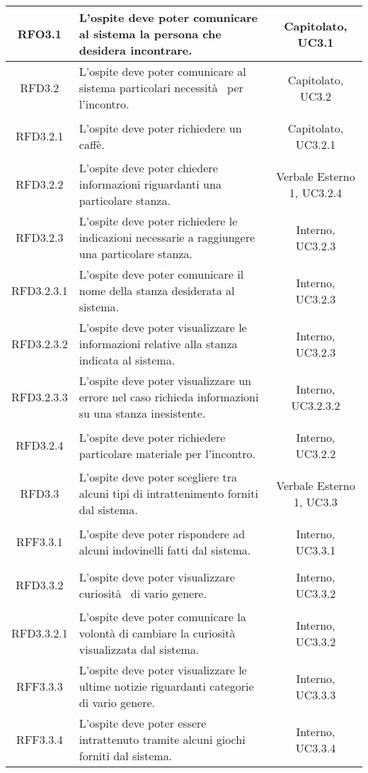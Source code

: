 \begin{longtable}{|c|>{\centering}m{7cm}|c|}
\hypertarget{RFO3.1}{RFO3.1} & L'ospite deve poter comunicare al sistema la persona che desidera incontrare. & Capitolato, UC3.1\\ \hline
\hypertarget{RFD3.2}{RFD3.2} & L'ospite deve poter comunicare al sistema particolari necessità  per l'incontro. & Capitolato, UC3.2\\ \hline
\hypertarget{RFD3.2.1}{RFD3.2.1} & L'ospite deve poter richiedere un caffè. & Capitolato, UC3.2.1\\ \hline
\hypertarget{RFD3.2.2}{RFD3.2.2} & L'ospite deve poter chiedere informazioni riguardanti una particolare stanza. & Verbale Esterno 1, UC3.2.4\\ \hline
\hypertarget{RFD3.2.3}{RFD3.2.3} & L'ospite deve poter richiedere le indicazioni necessarie a raggiungere una particolare stanza. & Interno, UC3.2.3\\ \hline
\hypertarget{RFD3.2.3.1}{RFD3.2.3.1} & L'ospite deve poter comunicare il nome della stanza desiderata al sistema. & Interno, UC3.2.3\\ \hline
\hypertarget{RFD3.2.3.2}{RFD3.2.3.2} & L'ospite deve poter visualizzare le informazioni relative alla stanza indicata al sistema. & Interno, UC3.2.3\\ \hline
\hypertarget{RFD3.2.3.3}{RFD3.2.3.3} & L'ospite deve poter visualizzare un errore nel caso richieda informazioni su una stanza inesistente. & Interno, UC3.2.3.2\\ \hline
\hypertarget{RFD3.2.4}{RFD3.2.4} & L'ospite deve poter richiedere particolare materiale per l'incontro. & Interno, UC3.2.2\\ \hline
\hypertarget{RFD3.3}{RFD3.3} & L'ospite deve poter scegliere tra alcuni tipi di intrattenimento forniti dal sistema. & Verbale Esterno 1, UC3.3\\ \hline
\hypertarget{RFF3.3.1}{RFF3.3.1} & L'ospite deve poter rispondere ad alcuni indovinelli fatti dal sistema. & Interno, UC3.3.1\\ \hline
\hypertarget{RFD3.3.2}{RFD3.3.2} & L'ospite deve poter visualizzare curiosità  di vario genere. & Interno, UC3.3.2\\ \hline
\hypertarget{RFD3.3.2.1}{RFD3.3.2.1} & L'ospite deve poter comunicare la volontà di cambiare la curiosità visualizzata dal sistema. & Interno, UC3.3.2\\ \hline
\hypertarget{RFF3.3.3}{RFF3.3.3} & L'ospite deve poter visualizzare le ultime notizie riguardanti categorie di vario genere. & Interno, UC3.3.3\\ \hline
\hypertarget{RFF3.3.4}{RFF3.3.4} & L'ospite deve poter essere intrattenuto tramite alcuni giochi forniti dal sistema. & Interno, UC3.3.4\\ \hline

\end{longtable}
